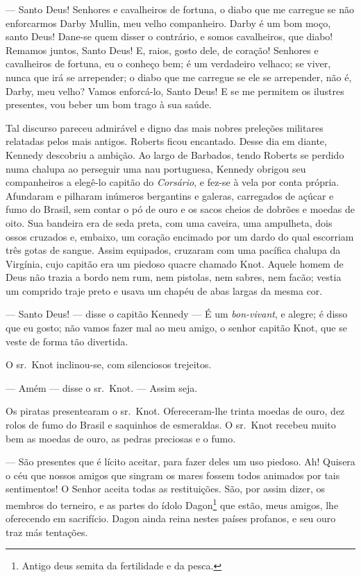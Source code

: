 --- Santo Deus! Senhores e cavalheiros de fortuna, o diabo que me carregue se
não enforcarmos Darby Mullin, meu velho companheiro. Darby é um bom moço,
santo Deus! Dane-se quem disser o contrário, e somos cavalheiros, que
diabo! Remamos juntos, Santo Deus! E, raios, gosto dele, de coração!
Senhores e cavalheiros de fortuna, eu o conheço bem; é um verdadeiro
velhaco; se viver, nunca que irá se arrepender; o diabo que me carregue se
ele se arrepender, não é, Darby, meu velho? Vamos enforcá-lo, Santo Deus! 
E se me permitem os ilustres presentes, vou beber um bom trago à sua
saúde.

Tal discurso pareceu admirável e digno das mais nobres preleções militares
relatadas pelos mais antigos. Roberts ficou encantado. Desse dia em
diante, Kennedy descobriu a ambição. Ao largo de Barbados, tendo Roberts
se perdido numa chalupa ao perseguir uma nau portuguesa, Kennedy obrigou
seu companheiros a elegê-lo capitão do \textit{Corsário}, e fez-se à vela
por conta própria. Afundaram e pilharam inúmeros bergantins e galeras,
carregados de açúcar e fumo do Brasil, sem contar o pó de ouro e os sacos
cheios de dobrões e moedas de oito. Sua bandeira era de seda preta, com
uma caveira, uma ampulheta, dois ossos cruzados e, embaixo, um coração
encimado por um dardo do qual escorriam três gotas de sangue. Assim
equipados, cruzaram com uma pacífica chalupa da Virgínia, cujo capitão era
um piedoso quacre chamado Knot. Aquele homem de Deus não trazia a bordo
nem rum, nem pistolas, nem sabres, nem facão; vestia um comprido traje
preto e usava um chapéu de abas largas da mesma cor.

--- Santo Deus! --- disse o capitão Kennedy --- É um \textit{bon-vivant}, e alegre;
é disso que eu gosto; não vamos fazer mal ao meu amigo, o senhor capitão
Knot, que se veste de forma tão divertida.

O sr.~Knot inclinou-se, com silenciosos trejeitos.

--- Amém --- disse o sr.~Knot. --- Assim seja.

Os piratas presentearam o sr.~Knot. Ofereceram-lhe trinta moedas de ouro,
dez rolos de fumo do Brasil e saquinhos de esmeraldas. O sr.~Knot recebeu
muito bem as moedas de ouro, as pedras preciosas e o fumo.

--- São presentes que é lícito aceitar, para fazer deles um uso piedoso. Ah!
Quisera o céu que nossos amigos que singram os mares fossem todos animados
por tais sentimentos! O Senhor aceita todas as restituições. São, por
assim dizer, os membros do terneiro, e as partes do ídolo Dagon\footnote{
Antigo deus semita da fertilidade e da pesca.} que estão, meus
amigos, lhe oferecendo em sacrifício. Dagon ainda reina nestes países
profanos, e seu ouro traz más tentações.

